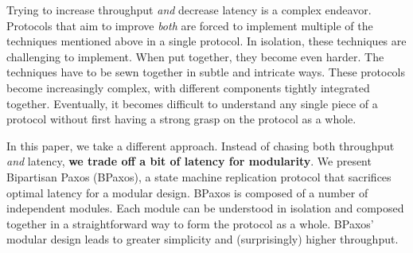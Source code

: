 Trying to increase throughput \emph{and} decrease latency is a complex
endeavor. Protocols that aim to improve \emph{both} are forced to implement
multiple of the techniques mentioned above in a single protocol. In isolation,
these techniques are challenging to implement. When put together, they become
even harder. The techniques have to be sewn together in subtle and intricate
ways. These protocols become increasingly complex, with different components
tightly integrated together. Eventually, it becomes difficult to understand any
single piece of a protocol without first having a strong grasp on
the protocol as a whole.

In this paper, we take a different approach. Instead of chasing both throughput
\emph{and} latency, \textbf{we trade off a bit of latency for modularity}. We
present Bipartisan Paxos (BPaxos), a state machine replication protocol that
sacrifices optimal latency for a modular design. BPaxos is composed of a number
of independent modules. Each module can be understood in isolation and composed
together in a straightforward way to form the protocol as a whole. BPaxos'
modular design leads to greater simplicity and (surprisingly) higher
throughput.

%
%

